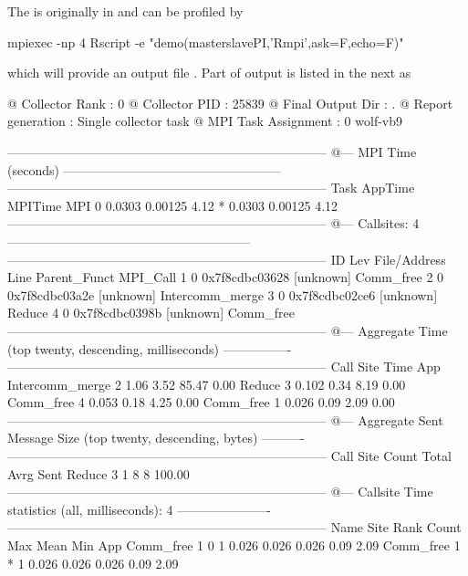 The  is originally in  and can be
profiled by
\begin{Code}
mpiexec -np 4 Rscript -e "demo(masterslavePI,'Rmpi',ask=F,echo=F)"
\end{Code}
which will provide an output file .
Part of output is listed in the next as
\begin{Output}
@ Collector Rank           : 0
@ Collector PID            : 25839
@ Final Output Dir         : .
@ Report generation        : Single collector task
@ MPI Task Assignment      : 0 wolf-vb9

---------------------------------------------------------------------------
  @--- MPI Time (seconds) ---------------------------------------------------
  ---------------------------------------------------------------------------
  Task    AppTime    MPITime     MPI%
0     0.0303    0.00125     4.12
*     0.0303    0.00125     4.12
---------------------------------------------------------------------------
  @--- Callsites: 4 ---------------------------------------------------------
  ---------------------------------------------------------------------------
  ID Lev File/Address        Line Parent_Funct             MPI_Call
1   0 0x7f8cdbc03628           [unknown]                Comm_free
2   0 0x7f8cdbc03a2e           [unknown]                Intercomm_merge
3   0 0x7f8cdbc02ce6           [unknown]                Reduce
4   0 0x7f8cdbc0398b           [unknown]                Comm_free
---------------------------------------------------------------------------
  @--- Aggregate Time (top twenty, descending, milliseconds) ----------------
  ---------------------------------------------------------------------------
  Call                 Site       Time    App%
Intercomm_merge         2       1.06    3.52   85.47    0.00
Reduce                  3      0.102    0.34    8.19    0.00
Comm_free               4      0.053    0.18    4.25    0.00
Comm_free               1      0.026    0.09    2.09    0.00
---------------------------------------------------------------------------
  @--- Aggregate Sent Message Size (top twenty, descending, bytes) ----------
  ---------------------------------------------------------------------------
  Call                 Site      Count      Total       Avrg  Sent%
Reduce                  3          1          8          8 100.00
---------------------------------------------------------------------------
  @--- Callsite Time statistics (all, milliseconds): 4 ----------------------
  ---------------------------------------------------------------------------
  Name              Site Rank  Count      Max     Mean      Min   App%
  Comm_free            1    0      1    0.026    0.026    0.026   0.09   2.09
Comm_free            1    *      1    0.026    0.026    0.026   0.09   2.09


\end{Output}
